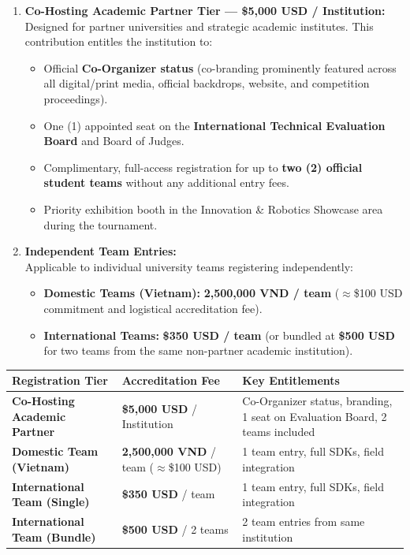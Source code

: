 \documentclass[12pt,a4paper]{article}
\begin{document}
\begin{enumerate}[label=\textbf{\arabic*.}]
\item \textbf{Co-Hosting Academic Partner Tier --- \$5,000 USD / Institution:}\\
Designed for partner universities and strategic academic institutes. This contribution entitles the institution to:
\begin{itemize}
    \item Official \textbf{Co-Organizer status} (co-branding prominently featured across all digital/print media, official backdrops, website, and competition proceedings).
    \item One (1) appointed seat on the \textbf{International Technical Evaluation Board} and Board of Judges.
    \item Complimentary, full-access registration for up to \textbf{two (2) official student teams} without any additional entry fees.
    \item Priority exhibition booth in the Innovation \& Robotics Showcase area during the tournament.
\end{itemize}

\item \textbf{Independent Team Entries:}\\
Applicable to individual university teams registering independently:
\begin{itemize}
    \item \textbf{Domestic Teams (Vietnam):} \textbf{2,500,000 VND / team} ($\approx$\$100 USD commitment and logistical accreditation fee).
    \item \textbf{International Teams:} \textbf{\$350 USD / team} (or bundled at \textbf{\$500 USD} for two teams from the same non-partner academic institution).
\end{itemize}
\end{enumerate}

\begin{center}
\begin{tabular}{lp{6.2cm}p{4.8cm}}
\toprule
\textbf{Registration Tier} & \textbf{Accreditation Fee} & \textbf{Key Entitlements} \\
\midrule
\textbf{Co-Hosting Academic Partner} & \textbf{\$5,000 USD} / Institution & Co-Organizer status, branding, 1 seat on Evaluation Board, 2 teams included \\
\textbf{Domestic Team (Vietnam)} & \textbf{2,500,000 VND} / team ($\approx$\$100 USD) & 1 team entry, full SDKs, field integration \\
\textbf{International Team (Single)} & \textbf{\$350 USD} / team & 1 team entry, full SDKs, field integration \\
\textbf{International Team (Bundle)} & \textbf{\$500 USD} / 2 teams & 2 team entries from same institution \\
\bottomrule
\end{tabular}
\end{center}
\end{document}
